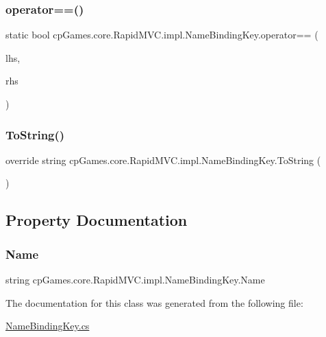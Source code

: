 \subsubsection{\texorpdfstring{operator==()}{operator==()}}
{\footnotesize\ttfamily static bool cp\+Games.\+core.\+Rapid\+M\+V\+C.\+impl.\+Name\+Binding\+Key.\+operator== (\begin{DoxyParamCaption}\item[{\mbox{\hyperlink{classcp_games_1_1core_1_1_rapid_m_v_c_1_1impl_1_1_name_binding_key}{Name\+Binding\+Key}}}]{lhs,  }\item[{\mbox{\hyperlink{interfacecp_games_1_1core_1_1_rapid_m_v_c_1_1_i_binding_key}{I\+Binding\+Key}}}]{rhs }\end{DoxyParamCaption})\hspace{0.3cm}{\ttfamily [static]}}

\mbox{\label{classcp_games_1_1core_1_1_rapid_m_v_c_1_1impl_1_1_name_binding_key_af76965c67dc7eb9377e27e55b6a8a1d5}} 
\subsubsection{\texorpdfstring{ToString()}{ToString()}}
{\footnotesize\ttfamily override string cp\+Games.\+core.\+Rapid\+M\+V\+C.\+impl.\+Name\+Binding\+Key.\+To\+String (\begin{DoxyParamCaption}{ }\end{DoxyParamCaption})}



\subsection{Property Documentation}
\mbox{\label{classcp_games_1_1core_1_1_rapid_m_v_c_1_1impl_1_1_name_binding_key_a844aa34461f42cbc7b77ab9505bdef12}} 
\subsubsection{\texorpdfstring{Name}{Name}}
{\footnotesize\ttfamily string cp\+Games.\+core.\+Rapid\+M\+V\+C.\+impl.\+Name\+Binding\+Key.\+Name\hspace{0.3cm}{\ttfamily [get]}}



The documentation for this class was generated from the following file\+:\begin{DoxyCompactItemize}
\item 
\mbox{\hyperlink{_name_binding_key_8cs}{Name\+Binding\+Key.\+cs}}\end{DoxyCompactItemize}
